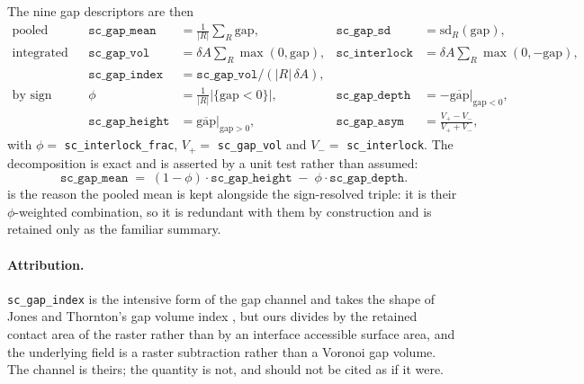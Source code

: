 \documentclass[11pt,a4paper]{article}
\newcommand{\dsc}[1]{\texttt{#1}}
\begin{document}
The nine gap descriptors are then
%
\begin{align}
\text{pooled} &&
\dsc{sc\_gap\_mean} &= \frac{1}{|R|}\sum_{R} \mathrm{gap}, &
\dsc{sc\_gap\_sd} &= \mathrm{sd}_{R}(\mathrm{gap}), \\
\text{integrated} &&
\dsc{sc\_gap\_vol} &= \delta A \!\! \sum_{R} \max(0, \mathrm{gap}), &
\dsc{sc\_interlock} &= \delta A \!\! \sum_{R} \max(0, -\mathrm{gap}), \\
&& \dsc{sc\_gap\_index} &= \dsc{sc\_gap\_vol} / (|R|\,\delta A), \\
\text{by sign} &&
\phi &= \tfrac{1}{|R|}\big|\{\mathrm{gap} < 0\}\big|, &
\dsc{sc\_gap\_depth} &= -\overline{\mathrm{gap}}\big|_{\mathrm{gap}<0}, \\
&& \dsc{sc\_gap\_height} &= \overline{\mathrm{gap}}\big|_{\mathrm{gap}>0}, &
\dsc{sc\_gap\_asym} &= \frac{V_{+} - V_{-}}{V_{+} + V_{-}},
\end{align}
%
with $\phi =$ \dsc{sc\_interlock\_frac}, $V_+ =$ \dsc{sc\_gap\_vol} and $V_- =$ \dsc{sc\_interlock}.
The decomposition is exact and is asserted by a unit test rather than assumed:
%
\begin{equation}
\dsc{sc\_gap\_mean} \;=\; (1-\phi)\cdot\dsc{sc\_gap\_height} \;-\; \phi \cdot \dsc{sc\_gap\_depth}.
\label{eq:gapdecomp}
\end{equation}
%
 is the reason the pooled mean is kept alongside the sign-resolved triple: it is
their $\phi$-weighted combination, so it is redundant with them by construction and is retained only
as the familiar summary.

\paragraph{Attribution.} \dsc{sc\_gap\_index} is the intensive form of the gap channel and takes
the shape of Jones and Thornton's gap volume index \cite{JonesThornton1996}, but ours divides by the
retained contact area of the raster rather than by an interface accessible surface area, and the
underlying field is a raster subtraction rather than a Voronoi gap volume. The channel is theirs;
the quantity is not, and should not be cited as if it were.
\end{document}
